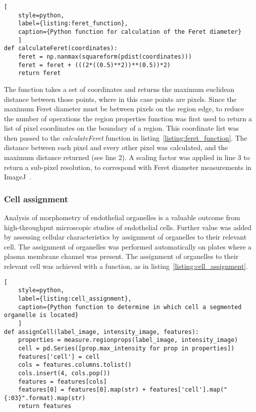 \begin{lstlisting}[
	style=python,
	label={listing:feret_function},
	caption={Python function for calculation of the Feret diameter}
	]
def calculateFeret(coordinates):
    feret = np.nanmax(squareform(pdist(coordinates)))
    feret = feret + (((2*((0.5)**2))**(0.5))*2)
    return feret
\end{lstlisting}

The function takes a set of coordinates and returns the maximum euclidean distance between those points, where in this case points are pixels. Since the maximum Feret diameter must be between pixels on the region edge, to reduce the number of operations the region properties function was first used to return a list of pixel coordinates on the boundary of a region. This coordinate list was then passed to the \emph{calculateFeret} function in listing~\ref{listing:feret_function}. The distance between each pixel and every other pixel was calculated, and the maximum distance returned (see line 2). A scaling factor was applied in line 3 to return a sub-pixel resolution, to correspond with Feret diameter measurements in ImageJ~\cite{ImageJ2003}.

\subsubsection{Cell assignment}
\label{endothelial_morphometry:image_processing:cell_assignment}
Analysis of morphometry of endothelial organelles is a valuable outcome from high-throughput microscopic studies of endothelial cells. Further value was added by assessing cellular characteristics by assignment of organelles to their relevant cell. The assignment of organelles was performed automatically on plates where a plasma membrane channel was present. The assignment of organelles to their relevant cell was achieved with a function, as in listing~\ref{listing:cell_assignment}.

\begin{lstlisting}[
	style=python,
	label={listing:cell_assignment},
	caption={Python function to determine in which cell a segmented organelle is located}
	]
def assignCell(label_image, intensity_image, features):
    properties = measure.regionprops(label_image, intensity_image)
    cell = pd.Series([prop.max_intensity for prop in properties])
    features['cell'] = cell
    cols = features.columns.tolist()
    cols.insert(4, cols.pop())
    features = features[cols]
    features[0] = features[0].map(str) + features['cell'].map("{:03}".format).map(str)
    return features
\end{lstlisting}

